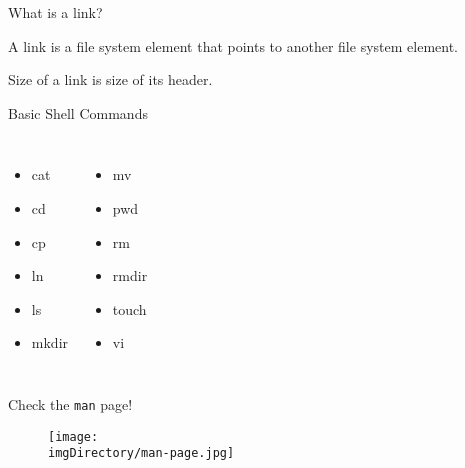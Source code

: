 \documentclass[compress]{beamer}
\begin{document}
\begin{slide}
	\begin{block}{What is a link?}

	A link is a file system element that points to another file system element.

	Size of a link is size of its header.

	\end{block}
\end{slide}

\begin{slide}
	\begin{block}{Basic Shell Commands}

	\begin{columns}
		\begin{itemize}
		\item[] cat
		\item[] cd
		\item[] cp
		\item[] ln
		\item[] ls
		\item[] mkdir
		\end{itemize}
		\begin{itemize}
		\item[] mv
		\item[] pwd
		\item[] rm
		\item[] rmdir
		\item[] touch
		\item[] vi
		\end{itemize}
	\end{columns}

	\end{block}
\end{slide}

\begin{slide}
	\begin{block}{Check the \texttt{man} page!}

	\begin{figure}
	\texttt{[image: \\imgDirectory/man-page.jpg]}
	\end{figure}

	\end{block}
\end{slide}
\end{document}
